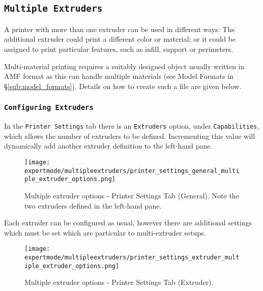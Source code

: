 
\subsection{\texttt{Multiple Extruders}} %
\label{sec:multiple_extruders}

A printer with more than one extruder can be used in different ways: The additional extruder could print a different color or material; or it could be assigned to print particular features, such as infill, support or perimeters.

Multi-material printing requires a suitably designed object usually written in AMF format as this can handle multiple materials (see Model Formats in §\ref{sub:model_formats}).  Details on how to create such a file are given below.


\subsubsection{\texttt{Configuring Extruders}} %
\label{sub:configuring_extruders}

In the \texttt{Printer Settings} tab there is an \texttt{Extruders} option, under \texttt{Capabilities}, which allows the number of extruders to be defined.  Incrementing this value will dynamically add another extruder definition to the left-hand pane.

\begin{figure}[H]
\centering
\texttt{[image: expertmode/multipleextruders/printer\_settings\_general\_multiple\_extruder\_options.png]}
\caption{Multiple extruder options - Printer Settings Tab (General).  Note the two extruders defined in the left-hand pane.}
\label{fig:printer_settings_general_multiple_extruder_options}
\end{figure}

Each extruder can be configured as usual, however there are additional settings which must be set which are particular to multi-extruder setups.

\begin{figure}[H]
\centering
\texttt{[image: expertmode/multipleextruders/printer\_settings\_extruder\_multiple\_extruder\_options.png]}
\caption{Multiple extruder options - Printer Settings Tab (Extruder).}
\label{fig:printer_settings_extruder_multiple_extruder_options}
\end{figure}

